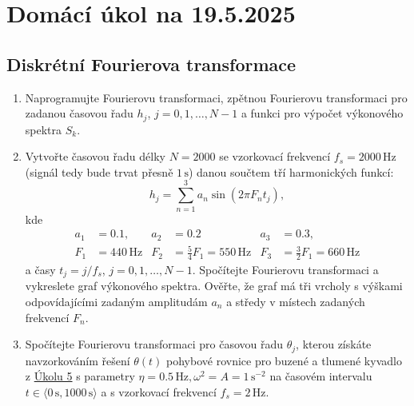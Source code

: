 \documentclass[a4paper,11pt,twoside]{article}
\begin{document}
\section*{Domácí úkol na 19.5.2025}
\subsection*{Diskrétní Fourierova transformace}

\begin{enumerate}
    \item Naprogramujte Fourierovu transformaci, zpětnou Fourierovu transformaci pro zadanou časovou řadu $h_j$, $j=0,1,\dotsc,N-1$ a funkci pro výpočet výkonového spektra $S_k$.

    \item
        Vytvořte časovou řadu délky $N=2000$ se vzorkovací frekvencí $f_{s}=2000\,\text{Hz}$ (signál tedy bude trvat přesně $1\,\text{s}$) danou součtem tří harmonických funkcí:
        \begin{equation*}
            h_{j}=\sum_{n=1}^{3}a_{n}\sin\left(2\pi F_{n} t_{j}\right),
            \label{eq:FTTest}
        \end{equation*}
        kde
        \begin{align}
            a_{1}&=0.1, & a_{2}&=0.2 & a_{3}&=0.3,\nonumber\\
            F_{1}&=440\,\text{Hz} & F_{2}&=\frac{5}{4} F_{1}=550\,\text{Hz} &F_{3}&=\frac{3}{2}F_{1}=660\,\text{Hz}\nonumber
        \end{align}
        a časy $t_{j}=j/f_{s}$, $j=0,1,\dotsc,N-1$.
        Spočítejte Fourierovu transformaci a vykreslete graf výkonového spektra.
        Ověřte, že graf má tři vrcholy s výškami odpovídajícími zadaným amplitudám $a_{n}$ a středy v místech zadaných frekvencí $F_{n}$.

    \item 
        Spočítejte Fourierovu transformaci pro časovou řadu $\theta_{j}$, kterou získáte navzorkováním řešení $\theta(t)$ pohybové rovnice pro buzené a tlumené kyvadlo z \href{https://github.com/PavelStransky/PCInPhysics/blob/main/ukoly/2025/Ukol5.pdf}{Úkolu 5} s parametry $\eta=0.5\,\text{Hz}, \omega^2=A=1\,\mathrm{s}^{-2}$ na časovém intervalu $t\in\langle 0\,\mathrm{s},1000\,\mathrm{s}\rangle$ a s vzorkovací frekvencí $f_{s}=2\,\text{Hz}$.
    

\end{enumerate}
\end{document}
